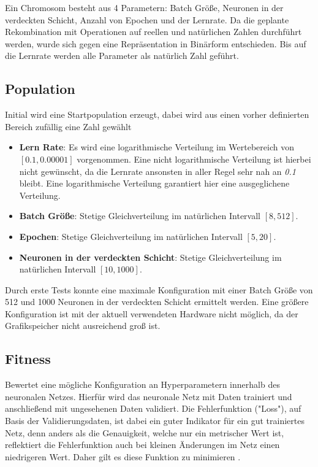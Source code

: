 Ein Chromosom besteht aus 4 Parametern: Batch Größe,  Neuronen in der verdeckten Schicht, Anzahl von Epochen und der Lernrate. Da die geplante Rekombination mit Operationen auf reellen und natürlichen Zahlen durchführt werden, wurde sich gegen eine Repräsentation in Binärform entschieden. Bis auf die Lernrate werden alle Parameter als natürlich Zahl geführt.
\subsection{Population}
Initial wird eine Startpopulation erzeugt, dabei wird aus einen vorher definierten Bereich zufällig eine Zahl gewählt
\begin{itemize}
	\item \textbf{Lern Rate}: Es wird eine logarithmische Verteilung im Wertebereich von \(\left[ 0.1, 0.00001 \right]\) vorgenommen. Eine nicht logarithmische Verteilung ist hierbei nicht gewünscht, da die Lernrate ansonsten in aller Regel sehr nah an \textit{0.1} bleibt. Eine logarithmische Verteilung garantiert hier eine ausgeglichene Verteilung.
	\item \textbf{Batch Größe}: Stetige Gleichverteilung im natürlichen Intervall \(\left[ 8, 512 \right]\). 
	\item \textbf{Epochen}: Stetige Gleichverteilung im natürlichen Intervall \(\left[ 5, 20 \right]\). 
	\item \textbf{Neuronen in der verdeckten Schicht}: Stetige Gleichverteilung im natürlichen Intervall \(\left[ 10, 1000 \right]\). 
\end{itemize}
Durch erste Tests konnte eine maximale Konfiguration mit einer Batch Größe von 512 und 1000 Neuronen in der verdeckten Schicht ermittelt werden. Eine größere Konfiguration ist mit der aktuell verwendeten Hardware nicht möglich, da der Grafikspeicher nicht ausreichend groß ist.

\subsection{Fitness}
Bewertet eine mögliche Konfiguration an Hyperparametern innerhalb des neuronalen Netzes. Hierfür wird das neuronale Netz mit Daten trainiert und anschließend mit ungesehenen Daten validiert. Die Fehlerfunktion ("Loss"), auf Basis der Validierungsdaten, ist dabei ein guter Indikator für ein gut trainiertes Netz, denn anders als die Genauigkeit, welche nur ein metrischer Wert ist, reflektiert die Fehlerfunktion auch bei kleinen Änderungen im Netz einen niedrigeren Wert. Daher gilt es diese Funktion zu minimieren \parencite[Kapitel~4.3]{goodfellow_deep_2016}. 
